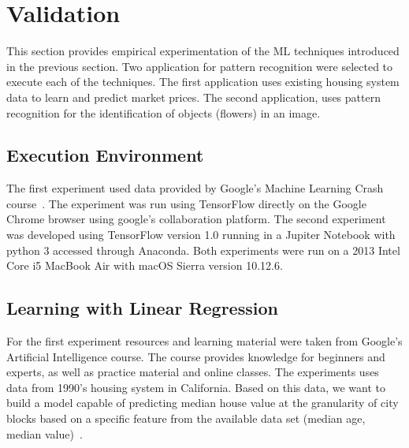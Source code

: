 

\section{Validation}
\label{sec:validation}

This section provides empirical experimentation of the \ac{ML} techniques introduced in the previous 
section. Two application for pattern recognition were selected to execute each of the techniques. The 
first application uses existing housing system data to learn and predict market prices. The second 
application, uses pattern recognition for the identification of objects (flowers) in an image.

\subsection{Execution Environment}

The first experiment used data provided by Google's Machine Learning Crash 
course~\cite{mlchrome18}. The experiment was run using TensorFlow directly on the Google 
Chrome browser using google's collaboration platform. 
The second experiment was developed using TensorFlow version 1.0 running in a Jupiter 
Notebook with python 3 accessed through Anaconda. 
Both experiments were run on a 2013 Intel Core i5 MacBook Air with macOS Sierra version 10.12.6.

\subsection{Learning with Linear Regression}

For the first experiment resources and learning material were taken from Google’s Artificial 
Intelligence course. The course provides knowledge for beginners and experts, as well as practice 
material and online classes. The experiments uses data from 1990’s housing system in California. 
Based on this data, we want to build a model capable of predicting median house value at the 
granularity of city blocks based on a specific feature from the available data set (\eg median age, 
median value)~\cite{mlchrome18}. 

